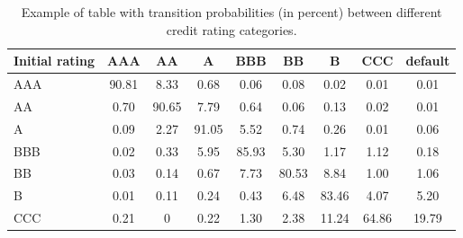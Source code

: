 \begin{codebox}
\begin{table}[htb]
	\centering
	\begin{tabular}{|l|c|c|c|c|c|c|c|c|}
	\hline
	Initial rating & AAA & AA & A & BBB & BB & B & CCC & default \\
	\hline
	\hline
	AAA & 90.81 & 8.33 & 0.68 & 0.06 & 0.08 & 0.02 & 0.01& 0.01 \\ 
	\hline
	AA & 0.70 & 90.65 & 7.79 & 0.64 & 0.06 & 0.13 & 0.02 & 0.01 \\ 
	\hline
	A & 0.09 & 2.27 & 91.05 & 5.52 & 0.74 & 0.26 & 0.01 & 0.06 \\ 
	\hline
	BBB & 0.02 & 0.33 & 5.95 & 85.93 & 5.30 & 1.17 & 1.12 & 0.18 \\
	\hline
	BB & 0.03 & 0.14 & 0.67 & 7.73 & 80.53 & 8.84 & 1.00 & 1.06 \\
	\hline
	B & 0.01 & 0.11 & 0.24 & 0.43 & 6.48 & 83.46 & 4.07 & 5.20 \\
	\hline
	CCC & 0.21 & 0 & 0.22 & 1.30 & 2.38 & 11.24 & 64.86 & 19.79 \\		
	\hline
\end{tabular}
\caption{Example of table with transition probabilities (in percent) between different credit rating categories.}
\label{tab:credit_ratings}
\end{table}


\end{codebox}
